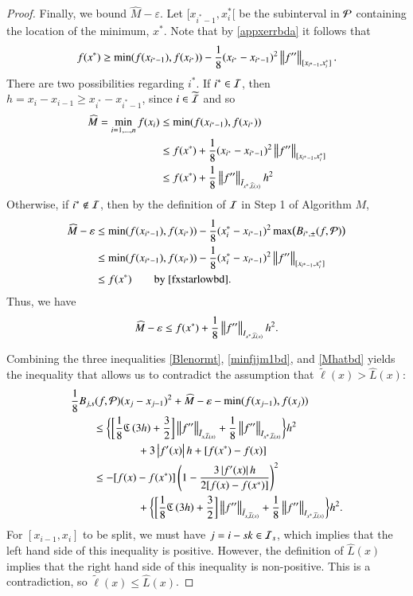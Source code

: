 \documentclass[review]{elsarticle}
\newcommand{\abstol}{\varepsilon}
\theoremstyle{definition}
\newcommand{\tell}{\tilde{\ell}}
\newcommand{\chL}{\widehat{L}}
\newcommand{\hM}{\widehat{M}}
\begin{document}
\begin{proof}
Finally, we bound $ \widehat{M}-\abstol$. Let $[x_{i^*-1}, x^*_i[$ be the
subinterval in $\cp$ containing the location of the minimum, $x^*$. Note that by
\eqref{appxerrbda} it follows that
\begin{equation} \label{fxstarlowbd}
f(x^*) \ge \min(f(x_{i^*-1}),f(x_{i^*})) - \frac18 (x_{i^*} - x_{i^*-1})^2\norm[{[x_{i^*-1}, x^*_i]}]{f''}.
\end{equation}
There are two possibilities regarding $i^*$. If $i^* \in \ci$, then $h = x_i -
x_{i-1} \ge x_{i^*} - x_{i^*-1}$, since $i \in \widetilde{\ci}$ and so
\begin{align*}
\hM  = \min_{i=1, \ldots, n} f(x_i) & \le \min(f(x_{i^*-1}),f(x_{i^*})) \\
& \le f(x^*) + \frac18  (x_{i^*} - x_{i^*-1})^2\norm[{[x_{i^*-1}, x^*_i]}]{f''} \\
& \le  f(x^*) + \frac18 \norm[{\bar{I}_{x^*,\chL(x)}}]{f''} h^2
\end{align*}
Otherwise, if $i^* \notin \ci$, then by the definition of $\ci$ in Step 1 of
Algorithm $M$,
\begin{align*}
\hM   - \abstol & \le \min(f(x_{i^*-1}),f(x_{i^*})) - \frac18 (x^*_i - x_{i^*-1})^2 \max \bigl(B_{i^*,\pm}(f,\cp) \bigr)  \\
& \le \min(f(x_{i^*-1}),f(x_{i^*})) - \frac18 (x^*_i - x_{i^*-1})^2 \norm[{[x_{i^*-1}, x^*_i]}]{f''}   \\
& \le  f(x^*) \qquad \text{by}~\eqref{fxstarlowbd} .
\end{align*}
Thus, we have
\begin{equation} \label{Mhatbd}
\hM - \abstol \le f(x^*) + \frac 18 \norm[{I_{x^*,\chL(x)}}]{f''} h^2.
\end{equation}

Combining the three inequalities \eqref{Blenormt}, \eqref{minfjjm1bd}, and
\eqref{Mhatbd} yields the inequality that allows us to contradict the assumption
that $\tell(x) > \chL(x)$:
\begin{align*}
\MoveEqLeft{\frac 18 B_{j,s}(f,\cp)(x_j-x_{j-1})^2 + \hM -\abstol - \min(f(x_{j-1}),f(x_{j}))} \\
& \le \biggl\{ \biggl[\frac 18 \fC\left(3h\right) + \frac 32 \biggr]   \norm[\bar{I}_{x,\chL(x)}]{f''} + \frac18\norm[{I_{x^*,\chL(x)}}]{f''} \biggr\} h^2 \\
& \qquad \qquad +  3 \abs{f'(x)} h + [f(x^*) - f(x)] \\
&  \le -[f(x) - f(x^*)] \left( 1 - \frac{3\abs{f'(x)}h}{2[f(x) - f(x^*)] } \right)^2  \\
& \qquad \qquad  +  \biggl\{ \biggl[\frac 18 \fC\left(3h\right) + \frac 32 \biggr]   \norm[\bar{I}_{x,\chL(x)}]{f''} + \frac18\norm[{I_{x^*,\chL(x)}}]{f''} \biggr\} h^2.
\end{align*}
For $[x_{i-1},x_i]$ to be split, we must have $j = i - sk \in \ci_s$, which
implies that the left hand side of this inequality is positive. However, the
definition of $\chL(x)$ implies that the right hand side of this inequality is
non-positive. This is a contradiction, so $\tell(x) \le \chL(x)$.
\end{proof}
\end{document}

